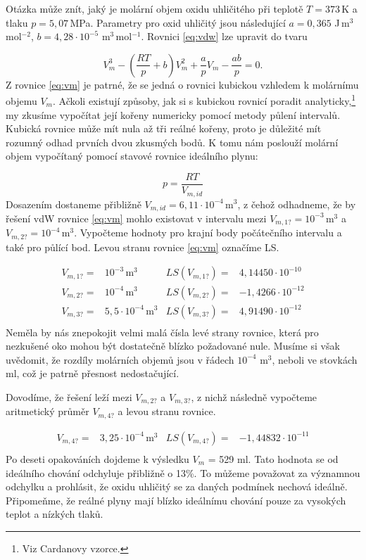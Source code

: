 \documentclass[a4paper,oneside,12pt]{article}
\begin{document}
Otázka může znít, jaký je molární objem oxidu uhličitého při teplotě
$T=373$\,K a tlaku $p=5,07$\,MPa. Parametry pro oxid uhličitý jsou
následující $a = 0,365$ J\,m$^3$\,mol$^{-2}$,
$b = 4,28 \cdot 10^{-5}$ m$^3$\,mol$^{-1}$. 
Rovnici \ref{eq:vdw} lze upravit do tvaru

\begin{equation}
V_m^3 - \left ( \frac{RT}{p} + b \right ) V_m^2 +
\frac{a}{p} V_m - \frac{ab}{p} = 0. 
\label{eq:vm}
\end{equation}
%
Z rovnice \ref{eq:vm} je patrné, že se jedná o rovnici kubickou vzhledem
k molárnímu objemu $V_m$. Ačkoli existují způsoby, jak si s kubickou rovnicí
poradit analyticky,\footnote{Viz Cardanovy vzorce.} my zkusíme vypočítat
její kořeny numericky pomocí metody půlení intervalů. 
Kubická rovnice může mít nula až tři reálné kořeny, proto je
důležité mít rozumný odhad prvních dvou zkusmých bodů. K tomu nám poslouží
molární objem vypočítaný pomocí stavové rovnice ideálního plynu:

\begin{equation}
p = \frac{RT}{V_{m,id}}
\label{eq:ig}
\end{equation}
%
Dosazením dostaneme přibližně $V_{m,id} = 6,11 \cdot 10^{-4}$\,m$^3$,
z čehož odhadneme, že by řešení vdW rovnice \ref{eq:vm} mohlo existovat
v intervalu mezi $V_{m,1?} = 10^{-3}$\,m$^3$ a $V_{m,2?} = 10^{-4}$\,m$^3$.
Vypočteme hodnoty pro krajní body počátečního intervalu a také pro půlící
bod. Levou stranu rovnice \ref{eq:vm} označíme LS.

\begin{align*}
V_{m,1?} = {} & 10^{-3} \mathrm{\,m^3}  &  LS(V_{m,1?}) = {} & 4,14450 \cdot 10^{-10} \\ 
V_{m,2?} = {} & 10^{-4} \mathrm{\,m^3}  &  LS(V_{m,2?}) = {} & -1,4266 \cdot 10^{-12} \\ 
V_{m,3?} = {} & 5,5 \cdot 10^{-4} \mathrm{\,m^3}  &  LS(V_{m,3?}) = {} & 4,91490 \cdot 10^{-12} \\ 
\end{align*}
%
Neměla by nás znepokojit velmi malá čísla levé strany rovnice, která
pro nezkušené oko mohou být dostatečně blízko požadované nule. Musíme
si však uvědomit, že rozdíly molárních objemů jsou v řádech $10^{-4}$ m$^3$,
neboli ve stovkách ml, což je patrně přesnost nedostačující.

Dovodíme, že řešení leží mezi $V_{m,2?}$ a $V_{m,3?}$, z nichž následně
vypočteme aritmetický průměr $V_{m,4?}$ a levou stranu rovnice.

\begin{align*}
V_{m,4?} = {} & 3,25 \cdot 10^{-4} \mathrm{\,m^3}  &  LS(V_{m,4?}) = {} & -1,44832 \cdot 10^{-11} \\ 
\end{align*}
%
Po deseti opakováních dojdeme k výsledku $V_m$ = 529 ml. Tato hodnota
se od ideálního chování odchyluje přibližně o 13\%. To můžeme považovat za
významnou odchylku a prohlásit, že oxidu uhličitý se za daných podmínek
nechová ideálně. Připomeňme, že reálné plyny mají blízko ideálnímu chování
pouze za vysokých teplot a nízkých tlaků.
\end{document}
